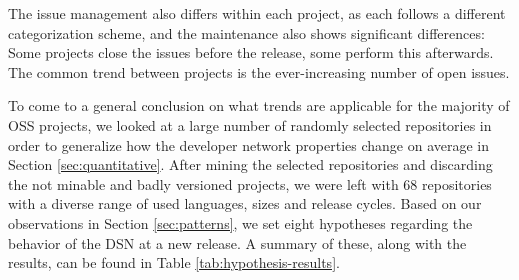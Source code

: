 The issue management also differs within each project, as each follows a different categorization scheme, and the maintenance also shows significant differences: Some projects close the issues before the release, some perform this afterwards. The common trend between projects is the ever-increasing number of open issues.

To come to a general conclusion on what trends are applicable for the majority of OSS projects, we looked at a large number of randomly selected repositories in order to generalize how the developer network properties change on average in Section \ref{sec:quantitative}. After mining the selected repositories and discarding the not minable and badly versioned projects, we were left with 68 repositories with a diverse range of used languages, sizes and release cycles. Based on our observations in Section \ref{sec:patterns}, we set eight hypotheses regarding the behavior of the DSN at a new release. A summary of these, along with the results, can be found in Table \ref{tab:hypothesis-results}. 

\begin{table}
    \centering
    \caption{Summary of the hypotheses results.}
    \label{tab:hypothesis-results}
\end{table}

